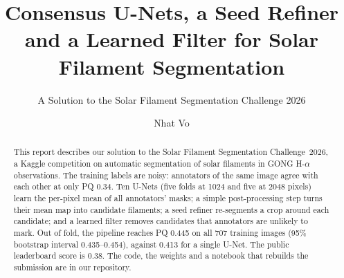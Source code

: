 \documentclass[sigconf]{acmart}
\begin{document}
\title{Consensus U-Nets, a Seed Refiner and a Learned Filter for Solar Filament Segmentation}  %
\subtitle{A Solution to the Solar Filament Segmentation Challenge 2026} %


\author{Nhat Vo} 


\begin{abstract}
    This report describes our solution to the Solar Filament Segmentation Challenge~2026, a Kaggle competition on automatic segmentation of solar filaments in GONG H-$\alpha$ observations. The training labels are noisy: annotators of the same image agree with each other at only
PQ 0.34. Ten U-Nets (five folds at 1024 and five at 2048 pixels) learn the per-pixel mean of
all annotators' masks; a simple post-processing step turns their mean map into candidate
filaments; a seed refiner re-segments a crop around each candidate; and a learned filter
removes candidates that annotators are unlikely to mark. Out of fold, the pipeline reaches
PQ 0.445 on all 707 training images (95\% bootstrap interval 0.435--0.454), against 0.413 for
a single U-Net. The public leaderboard score is 0.38. The code, the weights and a notebook
that rebuilds the submission are in our repository.
\end{abstract}

\maketitle

\ifguideStyle
{}
\par\medskip
\fi
\end{document}
